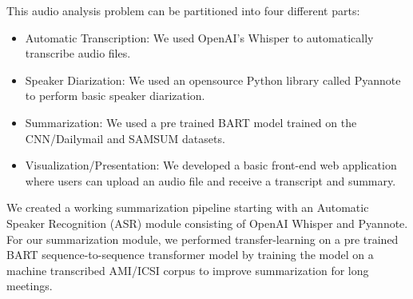 This audio analysis problem can be partitioned into four different parts:

\begin{itemize}
\item Automatic Transcription: We used OpenAI’s Whisper to automatically transcribe audio files.

\item Speaker Diarization: We used an opensource Python library called Pyannote to perform basic speaker diarization.

\item Summarization: We used a pre trained BART model trained on the CNN/Dailymail and SAMSUM datasets.

\item Visualization/Presentation: We developed a basic front-end web application where users can upload an audio file and receive a transcript and summary.

\end{itemize}

We created a working summarization pipeline starting with an Automatic Speaker Recognition (ASR) module consisting of OpenAI Whisper and Pyannote. For our summarization module, we performed transfer-learning on a pre trained BART sequence-to-sequence transformer model by training the model on a machine transcribed AMI/ICSI corpus to improve summarization for long meetings.

